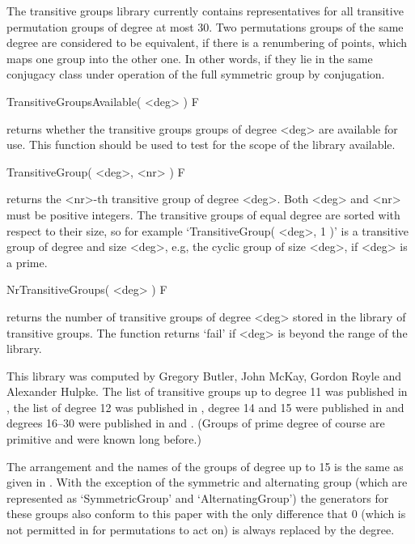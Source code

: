 



The transitive groups library currently contains representatives for all
transitive permutation groups of degree at most  30.
Two permutations groups of the same degree are considered to be
equivalent, if there is a renumbering of points, which maps one group into
the other one.
In other words, if they lie in the same conjugacy class under operation
of the full symmetric group by conjugation.

\>TransitiveGroupsAvailable( <deg> ) F

returns whether the transitive groups groups of degree <deg> are available
for use. This function should be used to test for the scope of the library
available.

\>TransitiveGroup( <deg>, <nr> ) F

returns the <nr>-th transitive  group of degree <deg>.  Both  <deg> and
<nr> must be  positive integers. The transitive groups of equal  degree
are  sorted with  respect to   their  size, so for  example
`TransitiveGroup(  <deg>, 1 )' is a  transitive group  of degree and
size <deg>, e.g, the cyclic  group  of size <deg>,   if <deg> is a
prime.

\>NrTransitiveGroups( <deg> ) F

returns the number of transitive groups of degree <deg> stored in the
library of transitive groups. The function returns `fail' if <deg> is
beyond the range of the library.

This library was computed by  Gregory Butler, John McKay, Gordon Royle
and Alexander Hulpke.  The list of transitive  groups up  to degree 11
was published in \cite{BM83},  the list of degree  12 was published in
\cite{Roy87}, degree 14 and  15 were published in  \cite{Butler93} and
degrees 16--30 were published in \cite{Hulpke96} and \cite{HulpkeTG}.
(Groups of prime degree of course are
primitive and were known long before.)

The arrangement and the names of the groups of degree up to 15 is the same
as given in \cite{ConwayHulpkeMcKay98}. With the exception of the symmetric
and alternating group (which are represented as `SymmetricGroup' and
`AlternatingGroup') the generators for these groups also conform to this
paper with the only difference that 0 (which is not permitted in {\GAP} for
permutations to act on) is always replaced by the degree.

